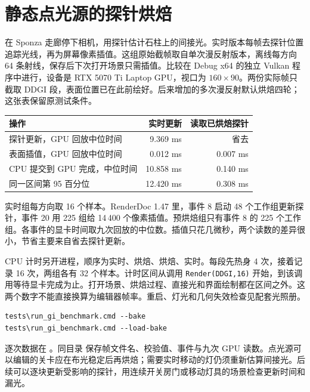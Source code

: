 \clearpage
\section{静态点光源的探针烘焙}

在 Sponza 走廊停下相机，用探针估计石柱上的间接光。实时版本每帧去探针位置追踪光线，再为屏幕像素插值。这组原始截帧取自单次漫反射版本，离线每方向 64 条射线，保存后下次打开场景只需插值。比较在 Debug x64 的独立 Vulkan 程序中进行，设备是 RTX 5070 Ti Laptop GPU，视口为 $160\times90$。两份实际帧只截取 DDGI 段，表面位置已在此前绘好。后来增加的多次漫反射默认烘焙四轮；这张表保留原测试条件。

{\small\noindent\begin{tabularx}{\linewidth}{@{}Xrr@{}}\toprule
操作 & 实时更新 & 读取已烘焙探针\\\midrule
探针更新，GPU 回放中位时间 & 9.369 ms & 省去\\
表面插值，GPU 回放中位时间 & 0.012 ms & 0.007 ms\\
CPU 提交到 GPU 完成，中位时间 & 10.858 ms & 0.140 ms\\
同一区间第 95 百分位 & 12.420 ms & 0.308 ms\\\bottomrule
\end{tabularx}\par}

实时组每方向取 16 个样本。RenderDoc 1.47 里，事件 8 启动 48 个工作组更新探针，事件 20 用 225 组给 14\,400 个像素插值。预烘焙组只有事件 8 的 225 个工作组。各事件的显卡时间取九次回放的中位数。插值只花几微秒，两个读数的差异很小，节省主要来自省去探针更新。

CPU 计时另开进程，顺序为实时、烘焙、烘焙、实时。每段先热身 4 次，接着记录 16 次，两组各有 32 个样本。计时区间从调用 \texttt{Render(DDGI,16)} 开始，到该调用等待显卡完成为止。打开场景、烘焙过程、直接光和界面绘制都在区间之外。这两个数字不能直接换算为编辑器帧率。重启、灯光和几何失效检查见配套光照册。

\begin{lstlisting}
tests\run_gi_benchmark.cmd --bake
tests\run_gi_benchmark.cmd --load-bake
\end{lstlisting}

逐次数据在 。同目录  保存帧文件名、校验值、事件与九次 GPU 读数。点光源可以编辑的关卡应在布光稳定后再烘焙；需要实时移动的灯仍须重新估算间接光。后续可以逐块更新受影响的探针，用连续开关房门或移动灯具的场景检查更新时间和漏光。

